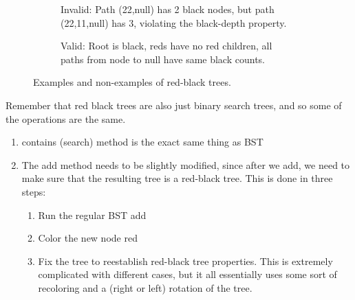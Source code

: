 \begin{definition}
\begin{figure}[H]
\begin{subfigure}[b]{0.32\textwidth}
        \caption{Invalid: Path (22,null) has 2 black nodes, but path (22,11,null) has 3, violating the black-depth property.}
        \label{fig:rb-invalid2}
      \end{subfigure}
      \hfill 
      \begin{subfigure}[b]{0.32\textwidth}
      \centering
        \caption{Valid: Root is black, reds have no red children, all paths from node to null have same black counts.}
        \label{fig:rb-valid}
      \end{subfigure}
      \caption{Examples and non-examples of red-black trees.}
      \label{fig:red-black-tree-examples}
    \end{figure}

    Remember that red black trees are also just binary search trees, and so some of the operations are the same.  
    \begin{enumerate}
      \item contains (search) method is the exact same thing as BST 
      \item The add method needs to be slightly modified, since after we add, we need to make sure that the resulting tree is a red-black tree. This is done in three steps: 
      \begin{enumerate}
        \item Run the regular BST add 
        \item Color the new node red 
        \item Fix the tree to reestablish red-black tree properties. This is extremely complicated with different cases, but it all essentially uses some sort of recoloring and a (right or left) rotation of the tree. 
      \end{enumerate}
    \end{enumerate}
  \end{definition}

